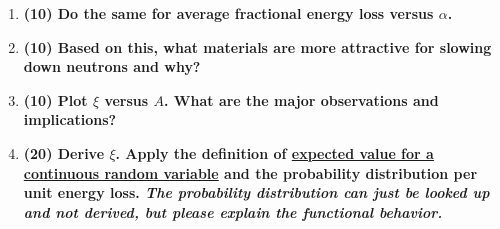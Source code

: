 \documentclass[11pt,a4paper]{article}
\begin{document}
\begin{enumerate}[leftmargin=*,topsep=0pt,font=\bfseries]
        
        
        
        \newpage
    \item\textbf{(10) Do the same for average fractional energy loss versus $\alpha$.}
        \vspace{0.25in}\\














        \newpage
    \item\textbf{(10) Based on this, what materials are more attractive for slowing down neutrons and why?}
        \vspace{0.25in}\\

        
        
        
        
        
        
        
        
        
        
        
        
        \newpage
    \item\textbf{(10) Plot $\xi$ versus $A$. What are the major observations and implications?}
        \vspace{0.25in}\\
        
        
        
        
        
        
        
        
        
        
        
        
        
        
        \newpage
    \item\textbf{(20) Derive $\xi$. Apply the definition of \href{https://courses.lumenlearning.com/uidaho-riskassessment/chapter/statistical-moments/}{expected value for a continuous random variable} and the probability distribution per unit energy loss. \textit{The probability distribution can just be looked up and not derived, but please explain the functional behavior.}}
        \vspace{0.25in}\\
        
        
        
        
        

\end{enumerate}
\end{document}
